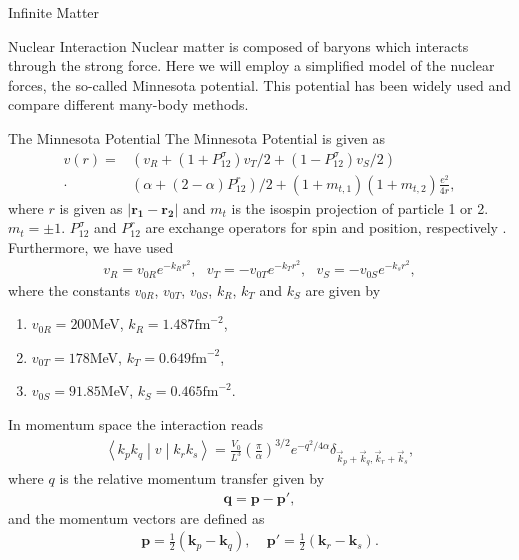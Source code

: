 \documentclass[twoside,english]{uiofysmaster}
\begin{document}
\begin{chapter}{Infinite Matter}
	\begin{section}{Nuclear Interaction}
		Nuclear matter is composed of baryons which interacts through the strong force. Here we will employ a simplified model of the nuclear forces, the so-called Minnesota potential. This potential has been widely used and compare different many-body methods.
		
		\begin{subsection}{The Minnesota Potential}
			The Minnesota Potential is given as
			\begin{align}
				v(r) = &\left(v_R + (1 + P_{12}^\sigma) v_T/2 + (1 - P_{12}^\sigma) v_S/2 \right) \\
					   \cdot &\left( \alpha + (2- \alpha)P_{12}^r \right)/2 + (1+m_{t,1})(1+m_{t,2})\frac{e^2}{4r}, \nonumber
			\end{align}
			where $r$ is given as $\left| \mathbf{r_1} - \mathbf{r_2} \right|$ and $m_t$ is the isospin projection of particle 1 or 2. $m_t = \pm 1$. 
			$P_{12}^\sigma $ and $P_{12}^r$ are exchange operators for spin and position, respectively \cite{Baardsen}. Furthermore, we have used
			\begin{align} 
				v_R = v_{0R}e^{-k_R r^2}, \:\:\: v_T = -v_{0T} e^{-k_Tr^2}, \:\:\: v_S = -v_{0S}e^{-k_sr^2},
			\end{align}
			where the constants $v_{0R}$, $v_{0T}$, $v_{0S}$, $k_R$, $k_T$ and $k_S$ are given by \cite{Thompson1977}
			\begin{enumerate}
				\item $v_{0R} = 200$MeV,  $k_R = 1.487 \text{fm}^{-2}$,
				\item $v_{0T} = 178$MeV,  $k_T = 0.649 \text{fm}^{-2}$,
				\item $v_{0S} = 91.85$MeV, $k_S = 0.465 \text{fm}^{-2}$.
			\end{enumerate}
In momentum space the interaction reads
			\begin{align}
			 	\left<k_p k_q \middle| v \middle| k_r k_s \right> = \frac{V_0}{L^3} \left(\frac{\pi}{\alpha}\right)^{3/2} e^{-q^2 / 4 \alpha} \delta_{\vec k_p + \vec k_q, \vec k_r + \vec k_s},
			\end{align}
			where $q$ is the relative momentum transfer given by 
			\begin{align}
				\mathbf{q} = \mathbf{p} - \mathbf{p'},
			\end{align}
			and the momentum vectors are defined as
			\begin{align}
				\mathbf{p} = \frac{1}{2} (\mathbf{k}_p - \mathbf{k}_q), \:\:\:\:\: \mathbf{p'} = \frac{1}{2}(\mathbf{k}_r- \mathbf{k}_s).

\end{align}
\end{subsection}
\end{section}
\end{chapter}
\end{document}
